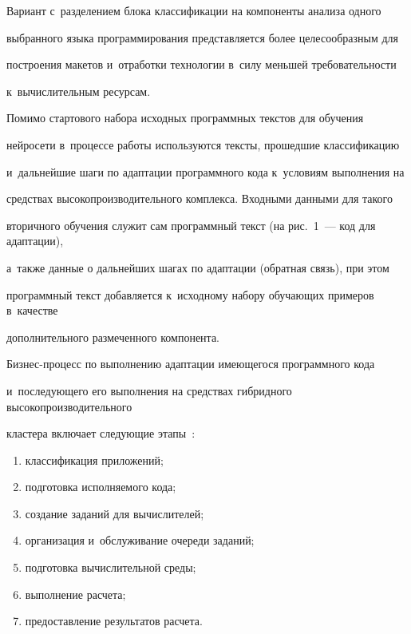       Вариант с~разделением блока классификации на компоненты анализа одного 

выбранного языка программирования представляется более целесообразным для 

построения макетов и~отработки технологии в~силу меньшей требовательности 

к~вычислительным ресурсам.

      

      Помимо стартового набора исходных программных текстов для обучения 

нейросети в~процессе работы используются тексты, прошедшие классификацию 

и~дальнейшие шаги по адаптации программного кода к~условиям выполнения на 

средствах высокопроизводительного комплекса. Входными данными для такого 

вторичного обучения служит сам программный текст (на рис.~1~--- код для адаптации), 

а~также данные о дальнейших шагах по адаптации (обратная связь), при этом 

программный текст добавляется к~исходному набору обучающих примеров в~качестве 

дополнительного размеченного компонента.

      

      Бизнес-процесс по выполнению адаптации имеющегося программного кода 

и~последующего его выполнения на средствах гибридного высокопроизводительного 

кластера включает следующие этапы~\cite{7-vol}:

      \begin{enumerate}[(1)]

      \item  классификация приложений;

      \item подготовка исполняемого кода; 

      \item создание заданий для вычислителей;

      \item организация и~обслуживание очереди заданий;

      \item  подготовка вычислительной среды;

      \item выполнение расчета;

      \item предоставление результатов расчета.

      \end{enumerate}

